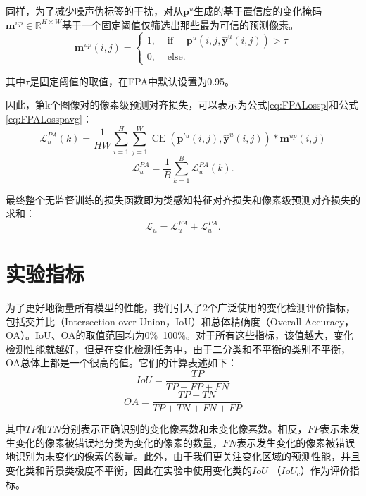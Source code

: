 \documentclass[lang=chs, degree=master, blindreview=false, adobe=false]{yanputhesis}
\begin{document}
同样，为了减少噪声伪标签的干扰，对从$\mathbf{p}^{u}$生成的基于置信度的变化掩码$\mathbf{m}^{u p}\in \mathbb{R}^{H \times W}$基于一个固定阈值仅筛选出那些最为可信的预测像素。
\begin{equation}
  \label{eq:FPAfilter}
  \mathbf{m}^{u p}(i, j)=\left\{\begin{array}{ll}
    1, & \text { if } \quad \mathbf{p}^{u}\left(i, j, \hat{\mathbf{y}}^{u}(i, j)\right)>\tau \\
    0, & \text { else. }
    \end{array}\right.
\end{equation}

其中$\tau$是固定阈值的取值，在FPA中默认设置为0.95。

因此，第k个图像对的像素级预测对齐损失，可以表示为公式\ref{eq:FPALossp}和公式\ref{eq:FPALosspavg}：
\begin{equation}
  \label{eq:FPALossp}
  \mathcal{L}_{u}^{P A}(k)=\frac{1}{H W} \sum_{i=1}^{H} \sum_{j=1}^{W} \operatorname{CE}\left(\mathbf{p}^{\prime u}(i, j), \hat{\mathbf{y}}^{u}(i, j)\right) * \mathbf{m}^{u p}(i, j)
\end{equation}
\begin{equation}
  \label{eq:FPALosspavg}
  \mathcal{L}_{u}^{P A}=\frac{1}{B} \sum_{k=1}^{B} \mathcal{L}_{u}^{P A}(k) .
\end{equation}

最终整个无监督训练的损失函数即为类感知特征对齐损失和像素级预测对齐损失的求和：
\begin{equation}
  \label{eq:FPALossu}
  \mathcal{L}_{u}=\mathcal{L}_{u}^{F A}+\mathcal{L}_{u}^{P A} .
\end{equation}
\section{实验指标}
为了更好地衡量所有模型的性能，我们引入了2个广泛使用的变化检测评价指标，包括交并比（Intersection over Union，IoU）和总体精确度（Overall Accuracy，OA）。IoU、OA的取值范围均为0$\%$~100$\%$。对于所有这些指标，该值越大，变化检测性能就越好，但是在变化检测任务中，由于二分类和不平衡的类别不平衡，OA总体上都是一个很高的值。它们的计算表述如下：
\begin{equation}
  \label{eq:IoU}
  I o U=\frac{T P}{T P+F P+F N}
\end{equation}
\begin{equation}
  \label{eq:OA}
  O A=\frac{T P+T N}{T P+T N+F N+F P}
\end{equation}

其中$TP$和$TN$分别表示正确识别的变化像素数和未变化像素数。相反，$FP$表示未发生变化的像素被错误地分类为变化的像素的数量，$FN$表示发生变化的像素被错误地识别为未变化的像素的数量。此外，由于我们更关注变化区域的预测性能，并且变化类和背景类极度不平衡，因此在实验中使用变化类的$IoU$ （$IoU_c$）作为评价指标。
\end{document}
